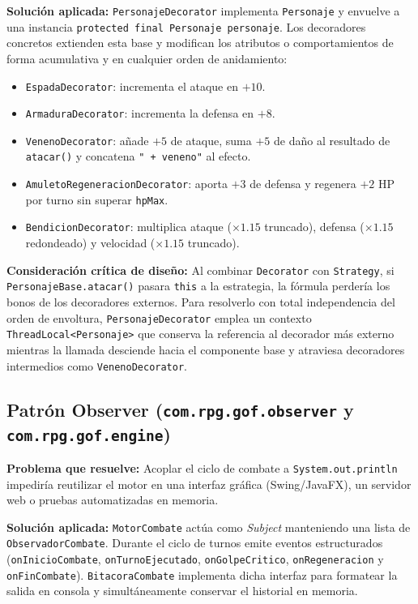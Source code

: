 \documentclass[12pt,letterpaper]{article}
\begin{document}
\textbf{Solución aplicada:} \texttt{PersonajeDecorator} implementa \texttt{Personaje} y envuelve a una instancia \texttt{protected final Personaje personaje}. Los decoradores concretos extienden esta base y modifican los atributos o comportamientos de forma acumulativa y en cualquier orden de anidamiento:
\begin{itemize}
    \item \texttt{EspadaDecorator}: incrementa el ataque en $+10$.
    \item \texttt{ArmaduraDecorator}: incrementa la defensa en $+8$.
    \item \texttt{VenenoDecorator}: añade $+5$ de ataque, suma $+5$ de daño al resultado de \texttt{atacar()} y concatena \texttt{" + veneno"} al efecto.
    \item \texttt{AmuletoRegeneracionDecorator}: aporta $+3$ de defensa y regenera $+2$ HP por turno sin superar \texttt{hpMax}.
    \item \texttt{BendicionDecorator}: multiplica ataque ($\times 1.15$ truncado), defensa ($\times 1.15$ redondeado) y velocidad ($\times 1.15$ truncado).
\end{itemize}

\textbf{Consideración crítica de diseño:} Al combinar \texttt{Decorator} con \texttt{Strategy}, si \texttt{PersonajeBase.atacar()} pasara \texttt{this} a la estrategia, la fórmula perdería los bonos de los decoradores externos. Para resolverlo con total independencia del orden de envoltura, \texttt{PersonajeDecorator} emplea un contexto \texttt{ThreadLocal<Personaje>} que conserva la referencia al decorador más externo mientras la llamada desciende hacia el componente base y atraviesa decoradores intermedios como \texttt{VenenoDecorator}.

\subsection{Patrón Observer (\texttt{com.rpg.gof.observer} y \texttt{com.rpg.gof.engine})}
\textbf{Problema que resuelve:} Acoplar el ciclo de combate a \texttt{System.out.println} impediría reutilizar el motor en una interfaz gráfica (Swing/JavaFX), un servidor web o pruebas automatizadas en memoria.

\textbf{Solución aplicada:} \texttt{MotorCombate} actúa como \textit{Subject} manteniendo una lista de \texttt{ObservadorCombate}. Durante el ciclo de turnos emite eventos estructurados (\texttt{onInicioCombate}, \texttt{onTurnoEjecutado}, \texttt{onGolpeCritico}, \texttt{onRegeneracion} y \texttt{onFinCombate}). \texttt{BitacoraCombate} implementa dicha interfaz para formatear la salida en consola y simultáneamente conservar el historial en memoria.
\end{document}
